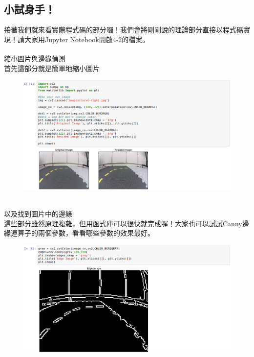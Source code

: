 \documentclass{article}
\begin{document}
\subsection{小試身手！}
接著我們就來看實際程式碼的部分囉！我們會將剛剛說的理論部分直接以程式碼實現！請大家用Jupyter Notebook開啟4-2的檔案。
\\\\縮小圖片與邊緣偵測
\\首先這部分就是簡單地縮小圖片
\begin{figure}[htp]
    \begin{center}
        \includegraphics[width=400pt]{pic/3_2_12.png}
    \end{center}
\end{figure}
\\
以及找到圖片中的邊緣
\\這些部分雖然原理複雜，但用函式庫可以很快就完成喔！大家也可以試試Canny邊緣運算子的兩個參數，看看哪些參數的效果最好。
\begin{figure}[htp]
    \begin{center}
        \includegraphics[width=400pt]{pic/3_2_13.png}
    \end{center}
\end{figure}
\end{document}
